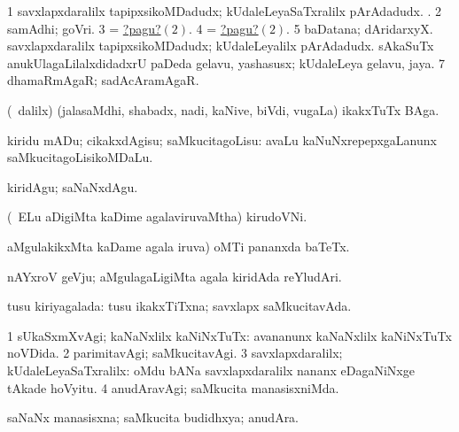 \noindent
\gl{\pagu}
\bmng
\bnum
\num{1}  savxlapxdaralilx tapipxsikoMDadudx; kUdaleLeyaSaTxralilx pArAdadudx. 
\hypertarget{narrow1pagu2}{}. 
\num{2}  samAdhi; goVri. 
\num{3}  = \hyperlink{narrow1pagu2}{?pagu?\((2)\)}. 
\num{4}  = \hyperlink{narrow1pagu2}{?pagu?\((2)\)}. 
\num{5}  baDatana; dAridarxyX. 
  
\banum
{} savxlapxdaralilx tapipxsikoMDadudx; kUdaleLeyalilx pArAdadudx. 
 sAkaSuTx anukUlagaLilalxdidadxrU paDeda gelavu, yashasusx; kUdaleLeya gelavu, jaya. 
\eanum
\numie
\num{7}  dhamaRmAgaR; sadAcAramAgaR. 
\enum
\emng
\eentry

\bentry
{}
\gl{\nA}
\bmng
(\sA\ \bava dalilx) (jalasaMdhi, shabadx, nadi, kaNive, biVdi, \mo vugaLa) ikakxTuTx BAga. 
\emng
\eentry

\bentry
{}
\gl{\sakirx}
\bmng
kiridu mADu; cikakxdAgisu; saMkucitagoLisu:  avaLu kaNuNxrepepxgaLanunx saMkucitagoLisikoMDaLu. 
\emng

\noindent
\gl{\akirx}
\bmng
kiridAgu; saNaNxdAgu. 
\emng
\eentry

\bentry
{}
\gl{\nA}
\bmng
(\kanmu\ ELu aDigiMta kaDime agalaviruvaMtha) kirudoVNi. 
\emng
\eentry

\bentry
{}
\gl{\nA}
\bmng
{} aMgulakikxMta kaDame agala iruva) oMTi pananxda baTeTx. 
\emng
\eentry

\bentry
{}
\gl{\nA}
\bmng
nAYxroV geVju;  aMgulagaLigiMta agala kiridAda reYludAri. 
\emng
\eentry

\bentry
{}
\gl{\gu}
\bmng
tusu kiriyagalada: tusu ikakxTiTxna; savxlapx saMkucitavAda. 
\emng
\eentry

\bentry
{}
\gl{\kirxvi}
\bmng
\bnum
\num{1} sUkaSxmXvAgi; kaNaNxlilx kaNiNxTuTx:  avananunx kaNaNxlilx kaNiNxTuTx noVDida. 
\num{2} parimitavAgi; saMkucitavAgi. 
\num{3} savxlapxdaralilx; kUdaleLeyaSaTxralilx:  oMdu bANa savxlapxdaralilx nananx eDagaNiNxge tAkade hoVyitu. 
\num{4} anudAravAgi; saMkucita manasisxniMda. 
\enum
\emng
\eentry

\bentry
{}
\gl{\gu}
\bmng
saNaNx manasisxna; saMkucita budidhxya; anudAra. 
\emng
\eentry


